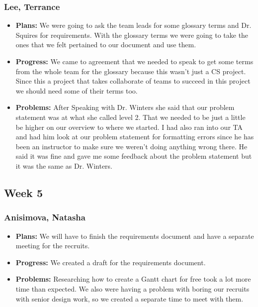 \documentclass[10pt,draftclsnofoot,onecolumn]{IEEEtran}
\begin{document}
\subsubsection{Lee, Terrance}
\begin{itemize}
	\item \textbf{Plans: }We were going to ask the team leads for some glossary terms and Dr. Squires for requirements. With the glossary terms we were going to take the ones that we felt pertained to our document and use them.
	\item \textbf{Progress: } We came to agreement that we needed to speak to get some terms from the whole team for the glossary because this wasn't just a CS project. Since this a project that takes collaborate of teams to succeed in this project we should need some of their terms too.
	\item \textbf{Problems: }After Speaking with Dr. Winters she said that our problem statement was at what she called level 2. That we needed to be just a little be higher on our overview to where we started. I had also ran into our TA and had him look at our problem statement for formatting errors since he has been an instructor to make sure we weren't doing anything wrong there. He said it was fine and gave me some feedback about the problem statement but it was the same as Dr. Winters.
\end{itemize}
\subsection{Week 5}
\subsubsection{Anisimova, Natasha}
\begin{itemize}
	\item \textbf{Plans: }
	We will have to finish the requirements document and have a separate meeting for the recruits.
	\item \textbf{Progress: }
	We created a draft for the requirements document.
	\item \textbf{Problems: }
	Researching how to create a Gantt chart for free took a lot more time than expected. We also were
	having a problem with boring our recruits with senior design work, so we created a separate time to meet with them.
\end{itemize}
\end{document}
